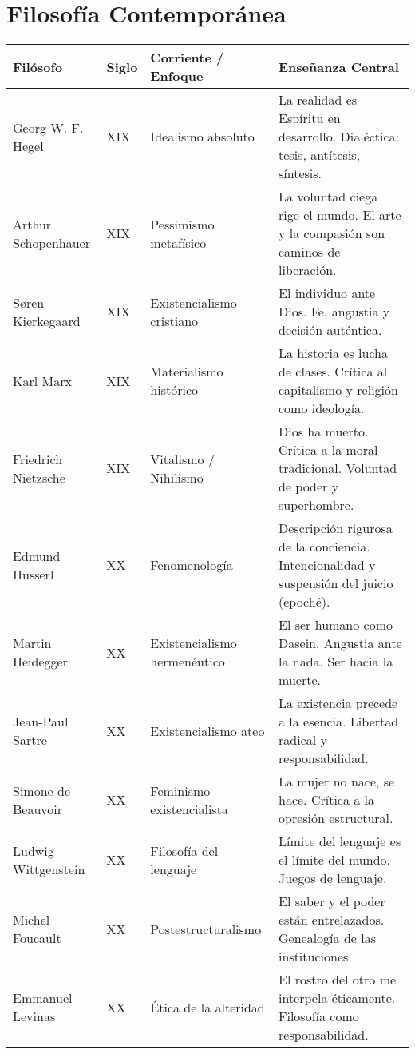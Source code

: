 \documentclass[12pt]{article}
\begin{document}
\section*{Filosofía Contemporánea}

\begin{tabularx}{\textwidth}{@{} l l l X @{}}
\toprule
\textbf{Filósofo} & \textbf{Siglo} & \textbf{Corriente / Enfoque} & \textbf{Enseñanza Central} \\
\midrule
Georg W. F. Hegel     & XIX         & Idealismo absoluto      & La realidad es Espíritu en desarrollo. Dialéctica: tesis, antítesis, síntesis. \\
Arthur Schopenhauer   & XIX         & Pessimismo metafísico   & La voluntad ciega rige el mundo. El arte y la compasión son caminos de liberación. \\
Søren Kierkegaard     & XIX         & Existencialismo cristiano & El individuo ante Dios. Fe, angustia y decisión auténtica. \\
Karl Marx             & XIX         & Materialismo histórico   & La historia es lucha de clases. Crítica al capitalismo y religión como ideología. \\
Friedrich Nietzsche   & XIX         & Vitalismo / Nihilismo    & Dios ha muerto. Crítica a la moral tradicional. Voluntad de poder y superhombre. \\
Edmund Husserl        & XX          & Fenomenología            & Descripción rigurosa de la conciencia. Intencionalidad y suspensión del juicio (epoché). \\
Martin Heidegger      & XX          & Existencialismo hermenéutico & El ser humano como Dasein. Angustia ante la nada. Ser hacia la muerte. \\
Jean-Paul Sartre      & XX          & Existencialismo ateo     & La existencia precede a la esencia. Libertad radical y responsabilidad. \\
Simone de Beauvoir    & XX          & Feminismo existencialista & La mujer no nace, se hace. Crítica a la opresión estructural. \\
Ludwig Wittgenstein   & XX          & Filosofía del lenguaje   & Límite del lenguaje es el límite del mundo. Juegos de lenguaje. \\
Michel Foucault       & XX          & Postestructuralismo      & El saber y el poder están entrelazados. Genealogía de las instituciones. \\
Emmanuel Levinas      & XX          & Ética de la alteridad    & El rostro del otro me interpela éticamente. Filosofía como responsabilidad. \\
\bottomrule
\end{tabularx}
\end{document}
